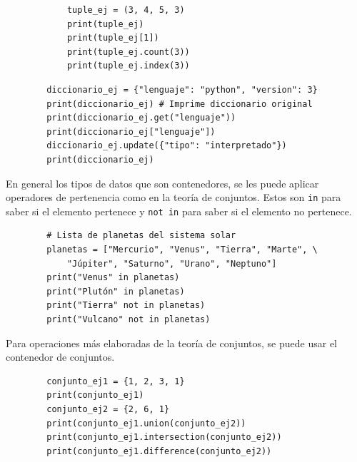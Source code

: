 \begin{listing}[H]
    \begin{verbatim}
            tuple_ej = (3, 4, 5, 3)
            print(tuple_ej)
            print(tuple_ej[1])
            print(tuple_ej.count(3))
            print(tuple_ej.index(3))
    \end{verbatim}
\end{listing}


\begin{listing}[H]
    \begin{verbatim}
        diccionario_ej = {"lenguaje": "python", "version": 3} 
        print(diccionario_ej) # Imprime diccionario original
        print(diccionario_ej.get("lenguaje")) 
        print(diccionario_ej["lenguaje"])
        diccionario_ej.update({"tipo": "interpretado"}) 
        print(diccionario_ej) 
    \end{verbatim}
\end{listing}


En general los tipos de datos que son contenedores, se les puede aplicar
operadores de pertenencia como en la teoría de conjuntos. Estos son
\texttt{in} para saber si el elemento pertenece y \texttt{not\ in} para
saber si el elemento no pertenece.

\begin{listing}[H]
    \begin{verbatim}
        # Lista de planetas del sistema solar
        planetas = ["Mercurio", "Venus", "Tierra", "Marte", \
            "Júpiter", "Saturno", "Urano", "Neptuno"]
        print("Venus" in planetas) 
        print("Plutón" in planetas) 
        print("Tierra" not in planetas)
        print("Vulcano" not in planetas)
    \end{verbatim}
\end{listing}

Para operaciones más elaboradas de la teoría de conjuntos, se puede usar
el contenedor de conjuntos.

\begin{listing}[H]
    \begin{verbatim}
        conjunto_ej1 = {1, 2, 3, 1} 
        print(conjunto_ej1) 
        conjunto_ej2 = {2, 6, 1}
        print(conjunto_ej1.union(conjunto_ej2))
        print(conjunto_ej1.intersection(conjunto_ej2)) 
        print(conjunto_ej1.difference(conjunto_ej2)) 
    \end{verbatim}
\end{listing}

